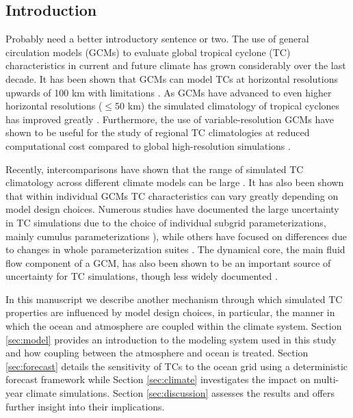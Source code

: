 \documentclass[draft,ms]{AGUTeX}
\begin{document}
\begin{article}

\section{Introduction}

{\color{red}  Probably need a better introductory sentence or two.} The use of general circulation models (GCMs) to evaluate global tropical cyclone (TC) characteristics in current and future climate has grown considerably over the last decade.  It has been shown that GCMs can model TCs at horizontal resolutions upwards of 100 km with limitations \citep[e.g.,][]{Bengtsson2007a,Knutson2010,Strachan2013}. As GCMs have advanced to even higher horizontal resolutions ($\le 50$ km) the simulated climatology of tropical cyclones has improved greatly \citep[e.g.,][]{Oouchi2006,Zhao2009,Murakami2012,Manganello2012,Satoh2012,Bacmeister2014,Wehner2014,Reed2015}. Furthermore, the use of variable-resolution GCMs have shown to be useful for the study of regional TC climatologies at reduced computational cost compared to global high-resolution simulations \citep{Zarzycki2014AMIPTCs}.  

Recently, intercomparisons have shown that the range of simulated TC climatology across different climate models can be large \citep{Camargo2013CMIP,Walsh2015CLIVAR}.  It has also been shown that within individual GCMs TC characteristics can vary greatly depending on model design choices.  Numerous studies have documented the large uncertainty in TC simulations due to the choice of individual subgrid parameterizations, mainly cumulus parameterizations \citep[e.g.,][]{Kim2012,Reed2011CAMPhysics,Lim2014TCconv}), while others have focused on differences due to changes in whole parameterization suites \citep{Reed2011c,Bacmeister2014}. The dynamical core, the main fluid flow component of a GCM, has also been shown to be an important source of uncertainty for TC simulations, though less widely documented \citep{ReedSimplePhys,Zhao2012,Reed2015}.

In this manuscript we describe another mechanism through which simulated TC properties are influenced by model design choices, in particular, the manner in which the ocean and atmosphere are coupled within the climate system. Section \ref{sec:model} provides an introduction to the modeling system used in this study and how coupling between the atmosphere and ocean is treated. Section \ref{sec:forecast} details the sensitivity of TCs to the ocean grid using a deterministic forecast framework while Section \ref{sec:climate} investigates the impact on multi-year climate simulations. Section \ref{sec:discussion} assesses the results and offers further insight into their implications.


\end{article}
\end{document}
